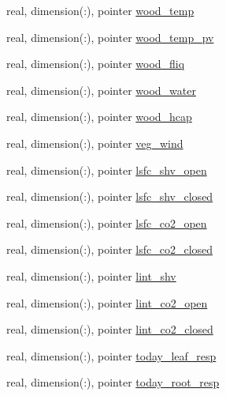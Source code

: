 \begin{DoxyCompactItemize}
\item 
real, dimension(\+:), pointer \hyperlink{structed__state__vars_1_1patchtype_a6d1612cfe69ba76b3b11875f8fac9481}{wood\+\_\+temp}
\item 
real, dimension(\+:), pointer \hyperlink{structed__state__vars_1_1patchtype_a1b9a95d5b1fdfe1cb26205193f6fb4b8}{wood\+\_\+temp\+\_\+pv}
\item 
real, dimension(\+:), pointer \hyperlink{structed__state__vars_1_1patchtype_a2a153d8c234436743e68bd80284ad081}{wood\+\_\+fliq}
\item 
real, dimension(\+:), pointer \hyperlink{structed__state__vars_1_1patchtype_ac3f6f7736a11aac4fc18dc2f9b5e00ce}{wood\+\_\+water}
\item 
real, dimension(\+:), pointer \hyperlink{structed__state__vars_1_1patchtype_a9f55ba804b4498b93071a5a764fc8480}{wood\+\_\+hcap}
\item 
real, dimension(\+:), pointer \hyperlink{structed__state__vars_1_1patchtype_ace41cbe840582a55a0300bebc961e5c6}{veg\+\_\+wind}
\item 
real, dimension(\+:), pointer \hyperlink{structed__state__vars_1_1patchtype_a901edfcdfa99312a1db9741191a1b20d}{lsfc\+\_\+shv\+\_\+open}
\item 
real, dimension(\+:), pointer \hyperlink{structed__state__vars_1_1patchtype_a26f26c6aa5e027b3c83d0f0b3c553c6d}{lsfc\+\_\+shv\+\_\+closed}
\item 
real, dimension(\+:), pointer \hyperlink{structed__state__vars_1_1patchtype_a5fde9764075ce135d295c39be49765f7}{lsfc\+\_\+co2\+\_\+open}
\item 
real, dimension(\+:), pointer \hyperlink{structed__state__vars_1_1patchtype_ab52950d2e035fb1f0536a5fb184e9d0c}{lsfc\+\_\+co2\+\_\+closed}
\item 
real, dimension(\+:), pointer \hyperlink{structed__state__vars_1_1patchtype_aed6db20a6a03085744723d855474e73e}{lint\+\_\+shv}
\item 
real, dimension(\+:), pointer \hyperlink{structed__state__vars_1_1patchtype_aea52f4d0f0e1f4f9e606def838d1b88c}{lint\+\_\+co2\+\_\+open}
\item 
real, dimension(\+:), pointer \hyperlink{structed__state__vars_1_1patchtype_adad6c0d8eec1cef451a8a16d22a94645}{lint\+\_\+co2\+\_\+closed}
\item 
real, dimension(\+:), pointer \hyperlink{structed__state__vars_1_1patchtype_a6feaf02081dc4e294672877c15e716bb}{today\+\_\+leaf\+\_\+resp}
\item 
real, dimension(\+:), pointer \hyperlink{structed__state__vars_1_1patchtype_a4f97d7cab4109b55df264180f0d0d619}{today\+\_\+root\+\_\+resp}

\end{DoxyCompactItemize}
